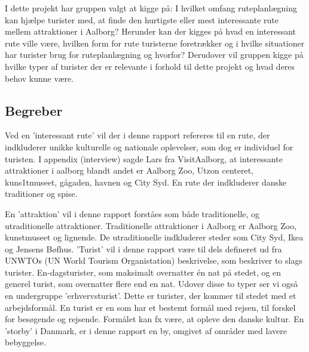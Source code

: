 I dette projekt har gruppen valgt at kigge på: I hvilket omfang ruteplanlægning kan hjælpe turister med, at finde den hurtigste eller mest interessante rute mellem attraktioner i Aalborg? Herunder kan der kigges på hvad en interessant rute ville være, hvilken form for rute turisterne foretrækker og i hvilke situationer har turister brug for ruteplanlægning og hvorfor? Derudover vil gruppen kigge på hvilke typer af turister der er relevante i forhold til dette projekt og hvad deres behov kunne være. \newline \newpage

\subsection{Begreber}
Ved en ’interessant rute’ vil der i denne rapport refereres til en rute, der indkluderer unikke kulturelle og nationale oplevelser, som dog er individuel for turisten. I appendix (interview) sagde Lars fra VisitAalborg, at interessante attraktioner i aalborg blandt andet er Aalborg Zoo, Utzon centeret, kuns1tmuseet, gågaden, havnen og City Syd. En rute der indkluderer danske traditioner og spise.\newline

En ’attraktion’ vil i denne rapport forståes som både traditionelle, og utraditionelle attraktioner. Traditionelle attraktioner i Aalborg er Aalborg Zoo, kunstmuseet og lignende. De utraditionelle indkluderer steder som City Syd, Ikea og Jensens Bøfhus.\newline
’Turist’ vil i denne rapport være til dels defineret ud fra UNWTOs (UN World Tourism Organistation) beskrivelse, som beskriver to slags turister. En-dagsturister, som maksimalt overnatter én nat på stedet, og en generel turist, som overnatter flere end en nat. Udover disse to typer ser vi også en undergruppe ’erhvervsturist’. Dette er turister, der kommer til stedet med et arbejdsformål. \newline
En turist er en som har et bestemt formål med rejsen, til forskel for besøgende og rejsende. Formålet kan fx være, at opleve den danske kultur. \newline
En ’storby’ i Danmark, er i denne rapport en by, omgivet af områder med lavere bebyggelse.


